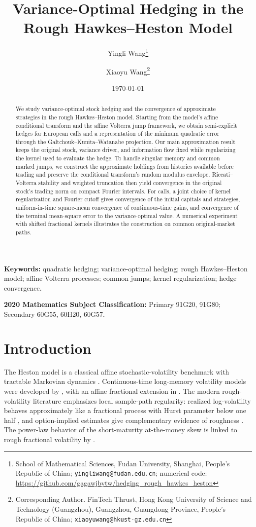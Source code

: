 \documentclass[11pt]{article}
\title{Variance-Optimal Hedging in the Rough Hawkes--Heston Model}
\author{Yingli Wang\thanks{School of Mathematical Sciences, Fudan University,
  Shanghai, People's Republic of China;
  \texttt{yingliwang@fudan.edu.cn}; numerical code:
  \url{https://github.com/gagawjbytw/hedging_rough_hawkes_heston}}
  \and
  Xiaoyu Wang\thanks{Corresponding Author. FinTech Thrust, Hong Kong University of Science and Technology (Guangzhou), Guangzhou, Guangdong Province, People's Republic of China;
\texttt{xiaoyuwang@hkust-gz.edu.cn}}}
\date{\today}
\theoremstyle{definition}
\theoremstyle{remark}
\newcommand{\1}{\mathbf{1}}
\begin{document}
\maketitle

\begin{abstract}
We study variance-optimal stock hedging and the convergence of approximate
strategies in the rough Hawkes--Heston model. Starting from the model's affine
conditional transform and the affine Volterra jump framework, we obtain
semi-explicit hedges for European calls and
a representation of the minimum quadratic error through the
Galtchouk--Kunita--Watanabe projection. Our main approximation result keeps
the original stock, variance driver, and information flow fixed while
regularizing the kernel used to evaluate the hedge. To handle singular
memory and common marked jumps, we construct the approximate holdings from
histories available before trading and preserve the conditional transform's
random modulus envelope. Riccati--Volterra stability and weighted truncation
then yield convergence in the original stock's trading norm on compact
Fourier intervals. For calls, a joint choice of kernel regularization and
Fourier cutoff gives convergence of the initial capitals and strategies,
uniform-in-time square-mean convergence of continuous-time gains, and
convergence of the terminal mean-square error to the variance-optimal value.
A numerical experiment with shifted fractional kernels illustrates the
construction on common original-market paths.
\end{abstract}

\medskip
\noindent\textbf{Keywords:}
quadratic hedging; variance-optimal hedging; rough Hawkes--Heston model;
affine Volterra processes; common jumps; kernel regularization;
hedge convergence.

\medskip
\noindent\textbf{2020 Mathematics Subject Classification:}
Primary 91G20, 91G80; Secondary 60G55, 60H20, 60G57.


\section{Introduction}
\label{sec:introduction}

The Heston model is a classical affine stochastic-volatility benchmark with
tractable Markovian dynamics \citep{heston1993}. Continuous-time
long-memory volatility models were developed by \citet{comterenault1998}, with
an affine fractional extension in \citet{comtecoutinrenault2012}. The modern
rough-volatility literature emphasizes local sample-path regularity: realized
log-volatility behaves approximately like a fractional process with Hurst
parameter below one half \citep{gatheral2018}, and option-implied estimates
give complementary evidence of roughness \citep{livierimoutipallavicini2018}.
The power-law behavior of the short-maturity at-the-money skew is linked to
rough fractional volatility by \citet{fukasawa2017,fukasawa2021}.
\end{document}
